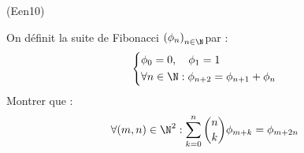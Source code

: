 \begin{tiny}(Een10)\end{tiny} On définit la suite de Fibonacci $\left( \phi_n\right) _{n\in \N}$par :
\begin{displaymath}
 \left\lbrace 
\begin{aligned}
 &\phi_0 = 0 , \quad \phi_1=1\\
&\forall n \in \N : \phi_{n+2}=\phi_{n+1} + \phi_n
\end{aligned}
\right. 
\end{displaymath}
 Montrer que :
\begin{displaymath}
\forall (m,n)\in \N^2 :  
\sum_{k=0}^n\binom{n}{k}\phi_{m+k} = \phi_{m+2n}
\end{displaymath}

